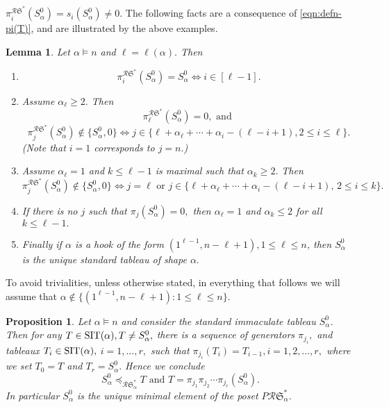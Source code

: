 \documentclass[12pt,letterpaper]{amsart}
\newtheorem{lemma}[theorem]{Lemma}
\newtheorem{proposition}[theorem]{Proposition}
\theoremstyle{definition}
\newcommand{\poRI}{\preccurlyeq_{\mathcal{R}{\mathfrak{S}}^\ast _\alpha}}  \newcommand{\poA}{\preccurlyeq_{\mathcal{A}^\ast _\alpha}}  \newcommand{\poAbar}{\preccurlyeq_{\mathcal{\bar{A}}^\ast _\alpha} } \newcommand{\poRIcover}{\prec_{\mathcal{R}{\mathfrak{S}}^\ast _\alpha}}
\newcommand{\rdI}{\mathcal{R}\mathfrak{S}^*}
\begin{document}
$\pi_i^{\rdI}(S^0_\alpha)=s_i(S^0_\alpha)\ne 0.$  The following facts are a consequence of \eqref{eqn:defn-pi(T)}, and are illustrated by the above examples.
\begin{lemma}\label{lem:bot-elt-facts} Let $\alpha\vDash n$ and $\ell=\ell(\alpha).$ Then
\begin{enumerate}
\item 
\begin{equation}\label{eqn:fix-bot-elt}  
\pi_i^{\rdI}(S^0_\alpha)=S^0_\alpha\iff i\in [\ell-1].
\end{equation}
\item Assume $\alpha_\ell\ge 2.$ Then 
\begin{equation}\label{eqn:fix-bot-elt1}  
\pi_\ell^{\rdI}(S^0_\alpha)=0, \text { and }
\end{equation}
\noindent
\begin{equation}\label{eqn:annihilate-bot-elt1}
 \pi_j^{\rdI}(S^0_\alpha)\notin \{S^0_\alpha, 0\}
 \iff j\in \{\ell+\alpha_\ell+\cdots+\alpha_{i}-(\ell-i+1), 2\le i\le \ell\}.
\end{equation}
(Note that $i=1$ corresponds to $j=n.$) 
\item Assume $\alpha_\ell=1$ and $k\le \ell-1$ is maximal such that $\alpha_k\ge 2.$   Then
\begin{equation}\label{eqn:annihilate-bot-elt2}
\pi_j^{\rdI}(S^0_\alpha)\notin \{S^0_\alpha, 0\}
\iff j=\ell \text{ or } j\in \{\ell+\alpha_\ell+\cdots+\alpha_{i}-(\ell-i+1),\, 2\le i\le k\}.
\end{equation}
\item If there is no $j$ such that $\pi_j(S^0_\alpha)=0,$ then $\alpha_\ell=1$ and $\alpha_k\le 2$ for all $k\le \ell-1.$
\item Finally if $\alpha$ is a hook of the form $ (1^{\ell-1},n-\ell+1), 1\le \ell\le n$, then $S^0_\alpha$ is the unique standard tableau of shape $\alpha.$
\end{enumerate}
\end{lemma}

To avoid trivialities, unless otherwise stated, in everything that follows we will assume that  $\alpha\notin\{(1^{\ell-1},n-\ell+1): 1\le \ell \le n\}$.

\begin{proposition}\label{prop:bot-elt} Let $\alpha\vDash n$ and consider the standard immaculate tableau $S^0_\alpha$.  Then for any $T\in \operatorname{SIT}(\alpha), T\ne S^0_\alpha,$ there is a sequence of generators $\pi_{j_i}, $ and tableaux $T_i\in \operatorname{SIT}(\alpha),$ $i=1,\ldots, r,$  such that $\pi_{j_i}(T_{i})=T_{i-1}, i=1,2,\ldots ,r,$ where we set $T_{0}=T$ and $T_r=S^0_\alpha.$ Hence we conclude 
\[ S^0_\alpha \poRI T \text{ and } T=\pi_{j_1}\pi_{j_{2}}\cdots\pi_{j_r}(S^0_\alpha).\]
In particular $S^0_\alpha$ is the unique minimal element of the poset $P\rdI_\alpha.$
\end{proposition}
\end{document}
